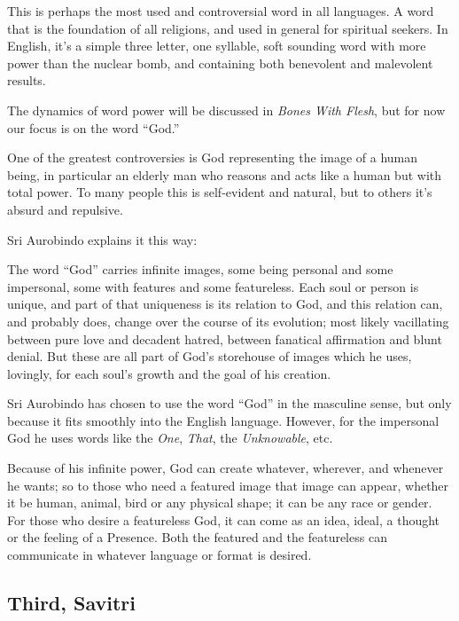 \documentclass[12pt,a4paper]{book}
\begin{document}
This is perhaps the most used and controversial word in all
languages. A word that is the foundation of all religions, and used in
general for spiritual seekers. In English, it's a simple three letter,
one syllable, soft sounding word with more power than the nuclear
bomb, and containing both benevolent and malevolent results.

The dynamics of word power will be discussed in \emph{Bones With Flesh}, but
for now our focus is on the word ``God.''

One of the greatest controversies is God representing the image of a
human being, in particular an elderly man who reasons and acts like a
human but with total power. To many people this is self-evident and
natural, but to others it's absurd and repulsive.

\noindent Sri Aurobindo explains it this way:

The word ``God'' carries infinite images, some being personal and some
impersonal, some with features and some featureless. Each soul or
person is unique, and part of that uniqueness is its relation to God,
and this relation can, and probably does, change over the course of
its evolution; most likely vacillating between pure love and decadent
hatred, between fanatical affirmation and blunt denial. But these are
all part of God's storehouse of images which he uses, lovingly, for
each soul's growth and the goal of his creation.

Sri Aurobindo has chosen to use the word ``God'' in the masculine
sense, but only because it fits smoothly into the English
language. However, for the impersonal God he uses words like the
\emph{One}, \emph{That}, the \emph{Unknowable}, etc.

Because of his infinite power, God can create whatever, wherever, and
whenever he wants; so to those who need a featured image that image
can appear, whether it be human, animal, bird or any physical shape;
it can be any race or gender. For those who desire a featureless God,
it can come as an idea, ideal, a thought or the feeling of a
Presence. Both the featured and the featureless can communicate in
whatever language or format is desired.


\subsection*{Third, Savitri}
\end{document}
